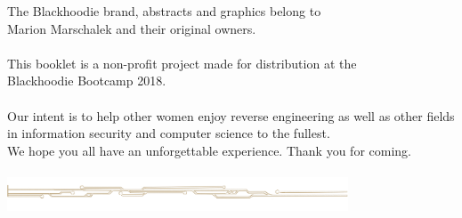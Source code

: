 \thispagestyle{empty}

\vspace*{\fill}
\begin{center}\footnotesize
The Blackhoodie brand, abstracts and graphics belong to\\Marion Marschalek and their original owners.\\
~\\
This booklet is a non-profit project made for distribution at the\\Blackhoodie Bootcamp 2018.\\
~\\
Our intent is to help other women enjoy reverse engineering as well as other fields in information security and computer science to the fullest.\\We hope you all have an unforgettable experience. Thank you for coming.\\
~\\
\includegraphics[height=10mm,keepaspectratio]{images/blackhoodie_div.pdf}
\end{center}
